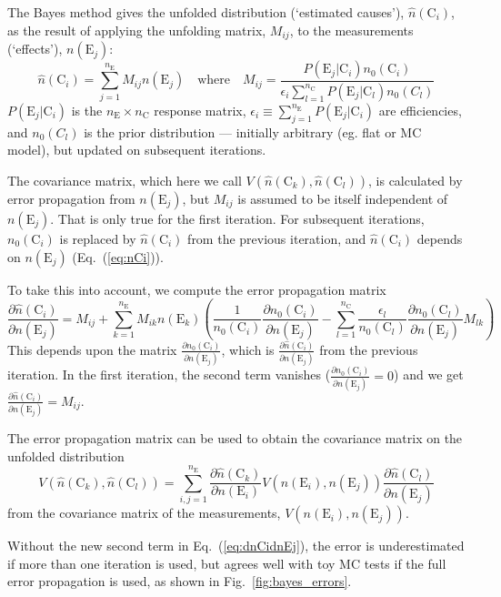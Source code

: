 \documentclass{cernrep}
\newcommand{\E}{\mathrm{E}}
\newcommand{\C}{\mathrm{C}}
\newcommand{\dd}[2]{\frac{\partial{#1}}{\partial{#2}}}
\begin{document}
The Bayes method gives the unfolded distribution (`estimated causes'), $\hat{n}(\C_i)$,
as the result of applying the unfolding matrix, $M_{ij}$, to the measurements (`effects'), $n(\E_j)$:
\begin{equation}
\hat{n}(\C_i) = \sum_{j=1}^{n_{\E}} M_{ij} n(\E_j)
\quad\mathrm{where}\quad
M_{ij} = \frac{P(\E_j|\C_i) n_0(\C_i)}{\epsilon_i \sum_{l=1}^{n_{\C}} P(\E_j|\C_l) n_0(C_l)}
\label{eq:nCi}
\end{equation}
\noindent $P(\E_j|\C_i)$ is the $n_{\E} \times n_{\C}$ response matrix,
$\epsilon_i \equiv \sum_{j=1}^{n_{\E}} P(\E_j|\C_i)$ are efficiencies, and
$n_0(C_l)$ is the prior distribution --- initially arbitrary (eg. flat or MC model), but updated on
subsequent iterations.

The covariance matrix, which here we call $V(\hat{n}(\C_k),\hat{n}(\C_l))$,
is calculated by error propagation from $n(\E_j)$,
but $M_{ij}$ is assumed to be itself independent of $n(\E_j)$. That is only true for the first iteration.
For subsequent iterations, $n_0(\C_i)$ is replaced by $\hat{n}(\C_i)$ from the
previous iteration, and $\hat{n}(\C_i)$ depends on $n(\E_j)$ (Eq.~(\ref{eq:nCi})).

To take this into account, we compute the error propagation matrix
\begin{equation}
\dd{\hat{n}(\C_i)}{n(\E_j)} = M_{ij} + \sum_{k=1}^{n_{\E}} M_{ik} n(\E_k)
\left( \frac{1}{n_0(\C_i)} \dd{n_0(\C_i)}{n(\E_j)} - \sum_{l=1}^{n_{\C}} \frac{\epsilon_l}{n_0(\C_l)} \dd{n_0(\C_l)}{n(\E_j)} M_{lk} \right)
\label{eq:dnCidnEj}
\end{equation}
This depends upon the matrix $\dd{n_0(\C_i)}{n(\E_j)}$, which is $\dd{\hat{n}(\C_i)}{n(\E_j)}$ from the previous iteration.
In the first iteration, the second term vanishes ($\dd{n_0(\C_i)}{n(\E_j)}=0$) and we get $\dd{\hat{n}(\C_i)}{n(\E_j)} = M_{ij}$.

The error propagation matrix can be used to obtain the covariance matrix on the unfolded distribution
\begin{equation}
V(\hat{n}(\C_k),\hat{n}(\C_l)) = \sum_{i,j=1}^{n_{\E}} \dd{\hat{n}(\C_k)}{n(\E_i)} V(n(\E_i),n(\E_j)) \dd{\hat{n}(\C_l)}{n(\E_j)}
\label{eq:Vij}
\end{equation}
\noindent from the covariance matrix of the measurements, $V(n(\E_i),n(\E_j))$.

Without the new second term in Eq.~(\ref{eq:dnCidnEj}),
the error is underestimated if more than one iteration
is used, but agrees well with toy MC tests if the full error propagation is used,
as shown in Fig.~\ref{fig:bayes_errors}.%
\end{document}
